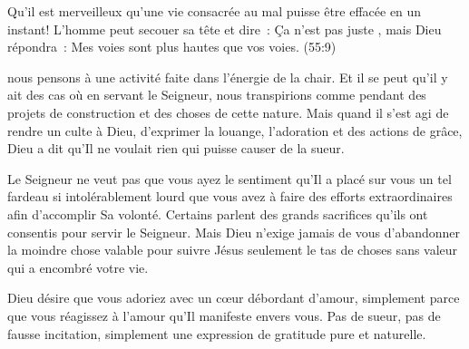 Qu'il est merveilleux qu'une vie consacrée au mal puisse être effacée
 en un instant! L'homme peut secouer sa tête et dire~: 
 \og Ça n'est pas juste \fg{}, mais Dieu répondra~: 
 \og Mes voies sont plus hautes que vos voies. \fg{}
 (55:9)

\dvrule







 nous pensons à une activité faite dans l'énergie de la chair.
 Et il se peut qu'il y ait des cas où en servant le Seigneur,
 nous transpirions \ocadr comme pendant des projets de construction
 et des choses de cette nature. Mais quand il s'est agi de rendre
 un culte à Dieu, d'exprimer la louange, l'adoration
 et des actions de grâce, Dieu a dit qu'Il ne voulait rien
 qui puisse causer de la sueur. 



Le Seigneur ne veut pas que vous ayez le sentiment qu'Il a placé sur vous
 un tel fardeau si intolérablement lourd que vous avez à faire des efforts
 extraordinaires afin d'accomplir Sa volonté. Certains parlent
 des grands sacrifices 
qu'ils ont consentis pour servir le Seigneur.
 Mais Dieu n'exige jamais de vous d'abandonner la moindre chose valable
 pour suivre Jésus \ocadr seulement le tas de choses sans valeur
 qui a encombré votre vie. 

Dieu désire que vous adoriez avec un cœur débordant d'amour,
 simplement parce que vous réagissez à l'amour qu'Il manifeste envers vous.
 Pas de sueur, pas de fausse incitation,
 simplement une expression de gratitude pure et naturelle. 

